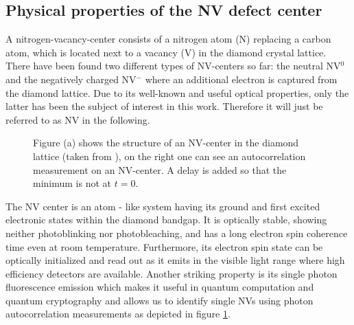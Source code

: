 \documentclass[12pt,a4paper]{article}
\begin{document}
\subsection{Physical properties of the NV defect center}
A nitrogen-vacancy-center consists of a nitrogen atom (N) replacing a carbon atom, which is located next to a vacancy (V) in the diamond crystal lattice. There have been found two different types of NV-centers so far: the neutral NV$^0$ and the negatively charged NV$^-$ where an additional electron is captured from the diamond lattice. Due to its well-known and useful optical properties, only the latter has been the subject of interest in this work. Therefore it will just be referred to as NV in the following. \\
\begin{figure}[h!]
    \caption{Figure (a) shows the structure of an NV-center in the diamond lattice (taken from \cite{repprog}), on the right one can see an autocorrelation measurement on an NV-center. A delay is added so that the minimum is not at $t=0$.}
\label{acm} 
\end{figure}
The NV center is an atom - like system having its ground and first excited electronic states within the diamond bandgap. It is optically stable, showing neither photoblinking nor photobleaching, and has a long electron spin coherence time even at room temperature. Furthermore, its electron spin state can be optically initialized and read out as it emits in the visible light range where high efficiency detectors are available. Another striking property is its single photon fluorescence emission which makes it useful in quantum computation and quantum cryptography\cite{qr}\cite{qc} and allows us to identify single NVs using photon autocorrelation measurements as depicted in figure \ref{acm}.\\
\end{document}
